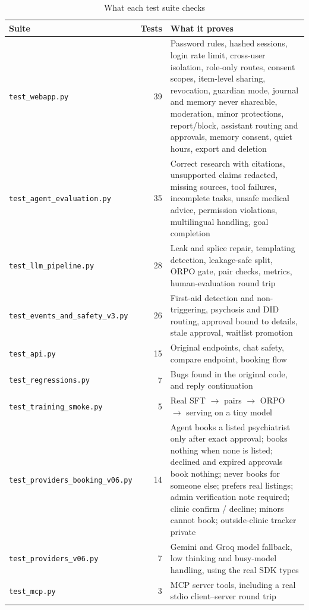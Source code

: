 \documentclass[11pt,a4paper]{article}
\newcommand{\code}[1]{\texttt{#1}}
\begin{document}
\begin{table}[H]
\centering
\caption{What each test suite checks}
\label{tab:tests}
\small
\begin{tabularx}{\textwidth}{@{}lrY@{}}
\toprule
\textbf{Suite} & \textbf{Tests} & \textbf{What it proves}\\
\midrule
\code{test\_webapp.py} & 39 & Password rules, hashed sessions, login rate limit, cross-user isolation, role-only routes, consent scopes, item-level sharing, revocation, guardian mode, journal and memory never shareable, moderation, minor protections, report/block, assistant routing and approvals, memory consent, quiet hours, export and deletion\\
\code{test\_agent\_evaluation.py} & 35 & Correct research with citations, unsupported claims redacted, missing sources, tool failures, incomplete tasks, unsafe medical advice, permission violations, multilingual handling, goal completion\\
\code{test\_llm\_pipeline.py} & 28 & Leak and splice repair, templating detection, leakage-safe split, ORPO gate, pair checks, metrics, human-evaluation round trip\\
\code{test\_events\_and\_safety\_v3.py} & 26 & First-aid detection and non-triggering, psychosis and DID routing, approval bound to details, stale approval, waitlist promotion\\
\code{test\_api.py} & 15 & Original endpoints, chat safety, compare endpoint, booking flow\\
\code{test\_regressions.py} & 7 & Bugs found in the original code, and reply continuation\\
\code{test\_training\_smoke.py} & 5 & Real SFT $\rightarrow$ pairs $\rightarrow$ ORPO $\rightarrow$ serving on a tiny model\\
\code{test\_providers\_booking\_v06.py} & 14 & Agent books a listed psychiatrist only after exact approval; books nothing when none is listed; declined and expired approvals book nothing; never books for someone else; prefers real listings; admin verification note required; clinic confirm / decline; minors cannot book; outside-clinic tracker private\\
\code{test\_providers\_v06.py} & 7 & Gemini and Groq model fallback, low thinking and busy-model handling, using the real SDK types\\
\code{test\_mcp.py} & 3 & MCP server tools, including a real stdio client--server round trip\\
\bottomrule
\end{tabularx}
\end{table}
\end{document}
